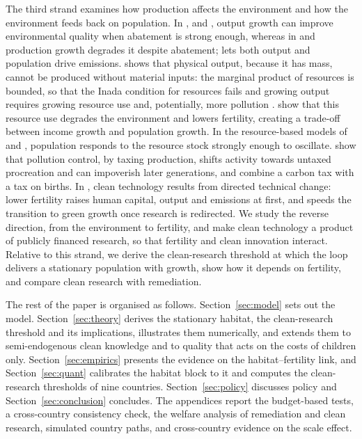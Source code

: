 \documentclass[11pt]{article}
\begin{document}
The third strand examines how production affects the environment and how the environment feeds back on
population. In \citet{raffin14}, \citet{econ2008} and \citet{marsiglio2018}, output growth can improve
environmental quality when abatement is strong enough, whereas in \citet{Varvarigos2013} and
\citet{pautrel08} production growth degrades it despite abatement; \citet{mar2017} lets both output and
population drive emissions. \citet{DZHUMASHEV2024} shows that physical output, because it has mass, cannot
be produced without material inputs: the marginal product of resources is bounded, so that the Inada
condition for resources fails and growing output requires growing resource use and, potentially, more
pollution \citep[see also][]{baum04}. \citet{dzhumashev2025} show that this resource use degrades the
environment and lowers fertility, creating a trade-off between income growth and population growth.
In the resource-based models of \citet{Brander1998} and \citet{lagerlof2006}, population responds to
the resource stock strongly enough to oscillate.
\citet{DELACROIX2012271} show that pollution control, by taxing production, shifts activity towards
untaxed procreation and can impoverish later generations, and \citet{gerlagh2023} combine a carbon tax
with a tax on births. In \citet{beulmann2025}, clean technology results from
directed technical change: lower fertility raises human capital, output and emissions at first, and
speeds the transition to green growth once research is redirected. We study the reverse direction, from
the environment to fertility, and make clean technology a product of publicly financed research, so that
fertility and clean innovation interact. Relative to this strand, we derive the clean-research threshold
at which the loop delivers a stationary population with growth, show how it depends on fertility, and
compare clean research with remediation.

The rest of the paper is organised as follows. Section~\ref{sec:model} sets out the model.
Section~\ref{sec:theory} derives the stationary habitat, the clean-research threshold and its
implications, illustrates them numerically, and extends them to semi-endogenous clean knowledge and to
quality that acts on the costs of children only. Section~\ref{sec:empirics} presents the evidence on the
habitat--fertility link, and Section~\ref{sec:quant} calibrates the habitat block to it and computes the
clean-research thresholds of nine countries. Section~\ref{sec:policy} discusses policy and
Section~\ref{sec:conclusion} concludes. The appendices report the budget-based tests, a cross-country
consistency check, the welfare analysis of remediation and clean research, simulated country paths, and
cross-country evidence on the scale effect.
\end{document}
